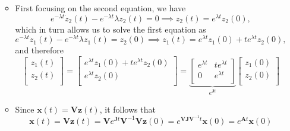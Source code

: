 \documentclass[12pt,a4paper]{article}
\begin{document}
\begin{itemize}
\begin{itemize}
\begin{equation}
    \end{equation}
  \item First focusing on the second equation, we have
    \begin{equation}\nonumber%
      e^{-\lambda t}\dot{z}_{2}(t) - e^{-\lambda t}\lambda z_{2}(t) = 0
      \implies
      z_{2}(t) = e^{\lambda t}z_{2}(0),
    \end{equation}
    which in turn allows us to solve the first equation as
    \begin{equation}\nonumber%
      e^{-\lambda t}\dot{z}_{1}(t) - e^{-\lambda t}\lambda z_{1}(t) = z_{2}(0)
      \implies
      z_{1}(t) = e^{\lambda t}z_{1}(0) + te^{\lambda t}z_{2}(0),
    \end{equation}
    and therefore
    \begin{equation}\nonumber%
      \begin{bmatrix}
        z_{1}(t)\\
        z_{2}(t)\\
      \end{bmatrix}
      =
      \begin{bmatrix}
        e^{\lambda t}z_{1}(0) + te^{\lambda t}z_{2}(0)\\
        e^{\lambda t}z_{2}(0)\\
      \end{bmatrix}
      =
      \underbrace{
      \begin{bmatrix}
        e^{\lambda t} & te^{\lambda t} \\
        0 & e^{\lambda t} \\
      \end{bmatrix}}_{e^{\bm{J}t}}
      \begin{bmatrix}
        z_{1}(0)\\
        z_{2}(0)\\
      \end{bmatrix}
    \end{equation}
  \item Since $\bm{x}(t)=\bm{V}\bm{z}(t)$,
    it follows that
    \begin{equation}\nonumber%
      \bm{x}(t)
      =
      \bm{V}
      \bm{z}(t)
      =
      \bm{V}
      e^{\bm{J}t}
      \bm{V}^{-1}
      \bm{V}
      \bm{z}(0)
      =
      e^{\bm{V}\bm{J}\bm{V}^{-1}t}
      \bm{x}(0)
      =
      e^{\bm{A}t}
      \bm{x}(0)
    \end{equation}
  \end{itemize}

\end{itemize}
\end{document}
